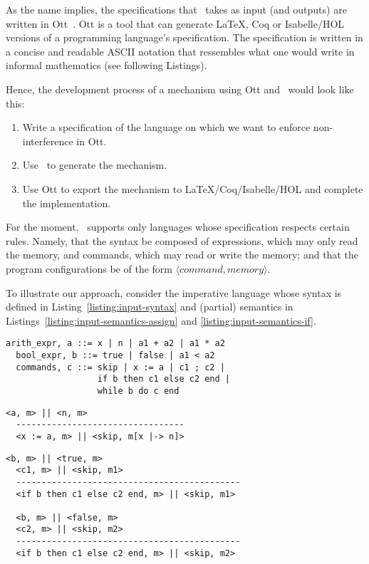 \documentclass[sigplan,10pt]{acmart}\settopmatter{printfolios=true,printccs=false,printacmref=false}
\begin{document}
As the name implies, the specifications that \ottifc\ takes as input (and outputs) are written in Ott~\cite{DBLP:journals/jfp/SewellNOPRSS10}. Ott is a tool that can generate LaTeX, Coq or Isabelle/HOL versions of a programming language's specification. The specification is written in a concise and readable ASCII notation that ressembles what one would write in informal mathematics (see following Listings).

Hence, the development process of a mechanism using Ott and \ottifc\ would look like this:
\begin{enumerate}
  \item Write a specification of the language on which we want to enforce non-interference in Ott.
  \item Use \ottifc\ to generate the mechanism.
  \item Use Ott to export the mechanism to LaTeX/Coq/Isabelle/HOL and complete the implementation.
\end{enumerate}

For the moment, \ottifc\ supports only languages whose specification respects certain rules. Namely, that the syntax be composed of expressions, which may only read the memory, and commands, which may read or write the memory; and that the program configurations be of the form $\langle command, memory\rangle$. 

To illustrate our approach, consider the imperative language whose syntax is defined in Listing~\ref{listing:input-syntax} and (partial) semantics in Listings~\ref{listing:input-semantics-assign} and \ref{listing:input-semantics-if}.
\newpage
\begin{lstlisting}[label=listing:input-syntax,captionpos=b,caption=Ott syntax of a simple imperative language]
  arith_expr, a ::= x | n | a1 + a2 | a1 * a2 
  bool_expr, b ::= true | false | a1 < a2
  commands, c ::= skip | x := a | c1 ; c2 | 
                  if b then c1 else c2 end | 
                  while b do c end   
\end{lstlisting}

\begin{lstlisting}[label=listing:input-semantics-assign,captionpos=b,caption={Ott big-step semantics of the assign command}]
  <a, m> || <n, m>
  ---------------------------------
  <x := a, m> || <skip, m[x |-> n]>
\end{lstlisting}

\begin{lstlisting}[label=listing:input-semantics-if, captionpos=b,caption={Ott big-step semantics of the if command}]
  <b, m> || <true, m>
  <c1, m> || <skip, m1>
  --------------------------------------------
  <if b then c1 else c2 end, m> || <skip, m1>

  <b, m> || <false, m>
  <c2, m> || <skip, m2>
  --------------------------------------------
  <if b then c1 else c2 end, m> || <skip, m2>
\end{lstlisting}
\end{document}
